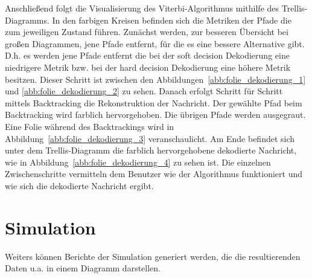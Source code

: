 Anschließend folgt die Visualisierung des Viterbi-Algorithmus mithilfe des Trellis-Diagramms. In den farbigen Kreisen befinden sich die Metriken der Pfade die zum jeweiligen Zustand führen. Zunächst werden, zur besseren Übersicht bei großen Diagrammen, jene Pfade entfernt, für die es eine bessere Alternative gibt. D.h. es werden jene Pfade entfernt die bei der soft decision Dekodierung eine niedrigere Metrik bzw. bei der hard decision Dekodierung eine höhere Metrik besitzen. Dieser Schritt ist zwischen den Abbildungen~\ref{abb:folie_dekodierung_1} und \ref{abb:folie_dekodierung_2} zu sehen. Danach erfolgt Schritt für Schritt mittels Backtracking die Rekonstruktion der Nachricht. Der gewählte Pfad beim Backtracking wird farblich hervorgehoben. Die übrigen Pfade werden ausgegraut. Eine Folie während des Backtrackings wird in Abbildung~\ref{abb:folie_dekodierung_3} veranschaulicht. Am Ende befindet sich unter dem Trellis-Diagramm die farblich hervorgehobene dekodierte Nachricht, wie in Abbildung~\ref{abb:folie_dekodierung_4} zu sehen ist. Die einzelnen Zwischenschritte vermitteln dem Benutzer wie der Algorithmus funktioniert und wie sich die dekodierte Nachricht ergibt.

\section{Simulation}
\label{kapitel:visualisierung_simulation}
Weiters können Berichte der Simulation generiert werden, die die resultierenden Daten u.a. in einem Diagramm darstellen.